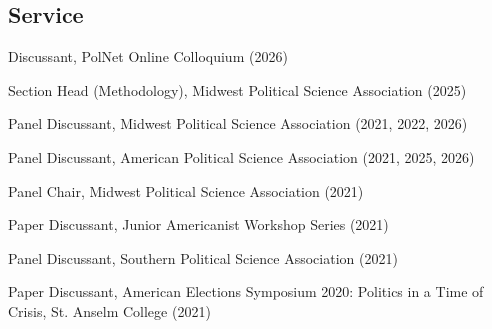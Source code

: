 \documentclass[letterpaper]{article}
\renewenvironment{itemize}{
  \begin{list}{}{
    \setlength{\leftmargin}{1.5em}
  }
}{
  \end{list}
}
\begin{document}
\subsection*{Service}
\begin{itemize}

\item Discussant, PolNet Online Colloquium (2026) 

\item Section Head (Methodology), Midwest Political Science Association (2025)

\item Panel Discussant, Midwest Political Science Association (2021, 2022, 2026)

\item Panel Discussant, American Political Science Association (2021, 2025, 2026)

\item Panel Chair, Midwest Political Science Association (2021)

\item Paper Discussant, Junior Americanist Workshop Series (2021)

\item Panel Discussant, Southern Political Science Association (2021)

\item Paper Discussant, American Elections Symposium 2020: Politics in a Time of Crisis, St. Anselm College (2021)

\end{itemize}
\end{document}
